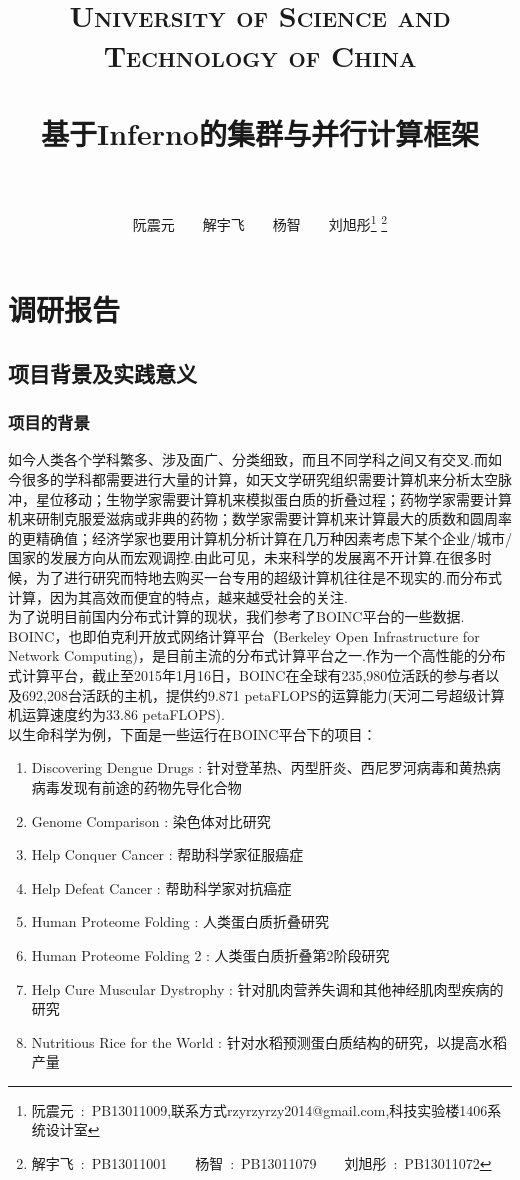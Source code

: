 \documentclass[paper=a4]{ctexart} %
\title{
  \normalfont \normalsize 
  \textsc{\\~\\~\\~\\~\\~\\University of Science and Technology of China} \\ [25pt] %
  \horrule{0.5pt} \\[0.4cm] %
  \huge 基于Inferno的集群与并行计算框架 \\ %
  \horrule{2pt} \\[0.5cm] %
}
\author{\Large{阮震元~~~~解宇飞~~~~杨智~~~~刘旭彤}\footnote{阮震元~:~PB13011009,联系方式rzyrzyrzy2014@gmail.com,科技实验楼1406系统设计室}
\setcounter{footnote}{-1}
\footnote{解宇飞~:~PB13011001~~~~杨智~:~PB13011079~~~~刘旭彤~:~PB13011072}
} %
\date{} %
\numberwithin{equation}{section} %
\numberwithin{figure}{section} %
\numberwithin{table}{section} %
\newcommand{\n}{\\\indent}
\begin{document}
\maketitle %
 
\clearpage
\setcounter{section}{0}
\setcounter{subsection}{0}
\setcounter{subsubsection}{0}
\tableofcontents
\clearpage

\section{调研报告}

\subsection{项目背景及实践意义}

\subsubsection{项目的背景}
如今人类各个学科繁多、涉及面广、分类细致，而且不同学科之间又有交叉.而如今很多的学科都需要进行大量的计算，如天文学研究组织需要计算机来分析太空脉冲，星位移动；生物学家需要计算机来模拟蛋白质的折叠过程；药物学家需要计算机来研制克服爱滋病或非典的药物；数学家需要计算机来计算最大的质数和圆周率的更精确值；经济学家也要用计算机分析计算在几万种因素考虑下某个企业/城市/国家的发展方向从而宏观调控.由此可见，未来科学的发展离不开计算.在很多时候，为了进行研究而特地去购买一台专用的超级计算机往往是不现实的.而分布式计算，因为其高效而便宜的特点，越来越受社会的关注.\n
为了说明目前国内分布式计算的现状，我们参考了BOINC平台的一些数据. \n
BOINC，也即伯克利开放式网络计算平台（Berkeley Open Infrastructure for Network Computing)，是目前主流的分布式计算平台之一.作为一个高性能的分布式计算平台，截止至2015年1月16日，BOINC在全球有235,980位活跃的参与者以及692,208台活跃的主机，提供约9.871 petaFLOPS的运算能力(天河二号超级计算机运算速度约为33.86 petaFLOPS).\n
以生命科学为例，下面是一些运行在BOINC平台下的项目：
\begin{enumerate}
\item Discovering Dengue Drugs : 针对登革热、丙型肝炎、西尼罗河病毒和黄热病病毒发现有前途的药物先导化合物
\item Genome Comparison : 染色体对比研究
\item Help Conquer Cancer : 帮助科学家征服癌症
\item Help Defeat Cancer : 帮助科学家对抗癌症
\item Human Proteome Folding : 人类蛋白质折叠研究 
\item Human Proteome Folding 2 : 人类蛋白质折叠第2阶段研究
\item Help Cure Muscular Dystrophy : 针对肌肉营养失调和其他神经肌肉型疾病的研究
\item Nutritious Rice for the World : 针对水稻预测蛋白质结构的研究，以提高水稻产量
\end{enumerate}
\end{document}
